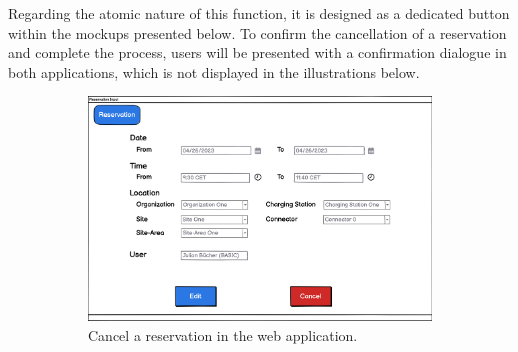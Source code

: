 \noindent Regarding the atomic nature of this function, it is designed as a dedicated button within the mockups presented below. To confirm the cancellation of a reservation and complete the process, users will be presented with a confirmation dialogue in both applications, which is not displayed in the illustrations below.

\begin{figure}[h]
    \centering
     \begin{subfigure}[c]{0.6\textwidth}
         \includegraphics[width=\textwidth]{resources/images/main/5_design/mockups/cancel_reservation/web/Cancel_Reservation.png}
         \captionsetup{skip=33pt}
         \caption{Cancel a reservation in the web application.}
         \label{fig:web-cancel-reservation-mockup}
    \end{subfigure}
     \hfill
     \begin{subfigure}[c]{0.3\textwidth}

\end{subfigure}
\end{figure}
